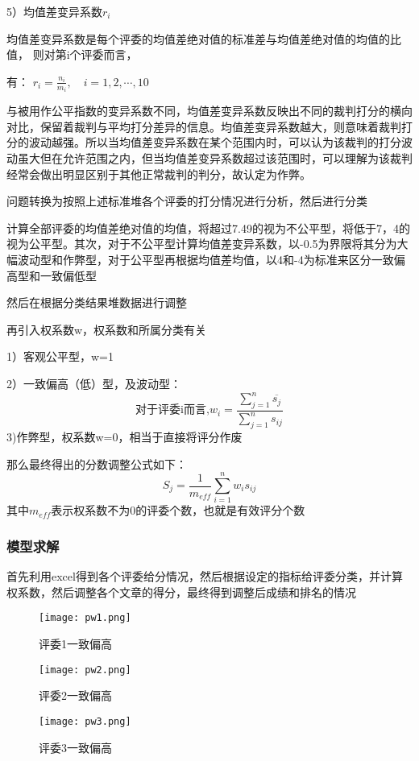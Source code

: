 \documentclass{my_paper}
\begin{document}
	5）均值差变异系数$r_i$
	
	均值差变异系数是每个评委的均值差绝对值的标准差与均值差绝对值的均值的比值，
	则对第i个评委而言，
	
	有： $ r_i=\frac{n_i}{m_i} ,\quad i=1,2,\cdots,10   $
	
	与被用作公平指数的变异系数不同，均值差变异系数反映出不同的裁判打分的横向对比，保留着裁判与平均打分差异的信息。均值差变异系数越大，则意味着裁判打分的波动越强。所以当均值差变异系数在某个范围内时，可以认为该裁判的打分波动虽大但在允许范围之内，但当均值差变异系数超过该范围时，可以理解为该裁判经常会做出明显区别于其他正常裁判的判分，故认定为作弊。
	
	问题转换为按照上述标准堆各个评委的打分情况进行分析，然后进行分类
	
	计算全部评委的均值差绝对值的均值，将超过7.49的视为不公平型，将低于7，4的视为公平型。其次，对于不公平型计算均值差变异系数，以-0.5为界限将其分为大幅波动型和作弊型，对于公平型再根据均值差均值，以4和-4为标准来区分一致偏高型和一致偏低型
	
	然后在根据分类结果堆数据进行调整
	
	再引入权系数w，权系数和所属分类有关
	
	1）客观公平型，w=1
	
	2）一致偏高（低）型，及波动型：
	$$\mbox{对于评委i而言,}w_i=\frac{\displaystyle \sum_{j=1}^{n} \overline{s_{j}}}{\displaystyle \sum_{j=1}^{n}s_{ij}}$$
	3)作弊型，权系数w=0，相当于直接将评分作废
	
	那么最终得出的分数调整公式如下：
	$$S_j= \displaystyle \frac{1}{m_{eff}}\sum_{i=1}^{n}w_i s_{ij}$$
	其中$m_{eff}$表示权系数不为0的评委个数，也就是有效评分个数
	\subsubsection{模型求解}
	首先利用excel得到各个评委给分情况，然后根据设定的指标给评委分类，并计算权系数，然后调整各个文章的得分，最终得到调整后成绩和排名的情况

	\begin{figure}[htbp]
		\centering
		\texttt{[image: pw1.png]}
		\caption{评委1一致偏高}
	\end{figure}

	\begin{figure}[htbp]
		\centering
		\texttt{[image: pw2.png]}
		\caption{评委2一致偏高}
	\end{figure}
	
	\begin{figure}[htbp]
		\centering
		\texttt{[image: pw3.png]}
		\caption{评委3一致偏高}
	\end{figure}
	
\end{document}
